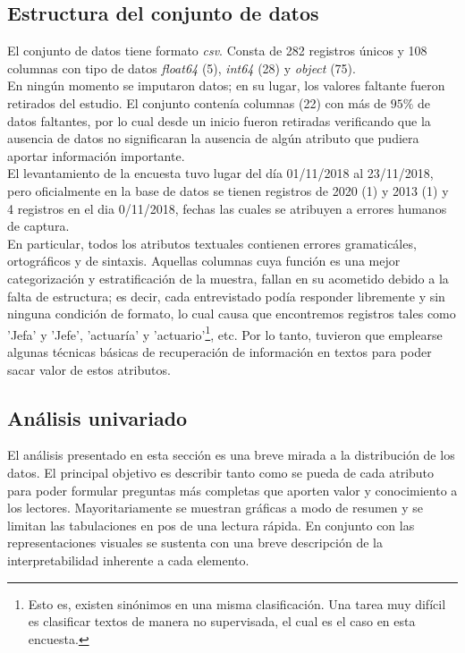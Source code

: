 \documentclass{article}
\begin{document}
\subsection{Estructura del conjunto de datos}

El conjunto de datos tiene formato \textit{csv}. Consta de 282 registros únicos y 108 columnas con tipo de datos \textit{float64} (5), \textit{int64} (28) y \textit{object} (75). \\

En ningún momento se imputaron datos; en su lugar, los valores faltante fueron retirados del estudio. El conjunto contenía columnas (22) con más de $95\%$ de datos faltantes, por lo cual desde un inicio fueron retiradas verificando que la ausencia de datos no significaran la ausencia de algún atributo que pudiera aportar información importante.  \\

El levantamiento de la encuesta tuvo lugar del día 01/11/2018 al 23/11/2018, pero oficialmente en la base de datos se tienen registros de 2020 (1) y 2013 (1) y 4 registros en el dia 0/11/2018, fechas las cuales se atribuyen a errores humanos de captura. \\

En particular, todos los atributos textuales contienen errores gramaticáles, ortográficos y de sintaxis. Aquellas columnas cuya función es una mejor categorización y estratificación de la muestra, fallan en su acometido debido a la falta de estructura; es decir, cada entrevistado podía responder libremente y sin ninguna condición de formato, lo cual causa que encontremos registros tales como 'Jefa' y 'Jefe', 'actuaría' y 'actuario'\footnote{Esto es, existen sinónimos en una misma clasificación. Una tarea muy difícil es clasificar textos de manera no supervisada, el cual es el caso en esta encuesta.}, etc. Por lo tanto, tuvieron que emplearse algunas técnicas básicas de recuperación de información en textos para poder sacar valor de estos atributos. 

\subsection{Análisis univariado}

El análisis presentado en esta sección es una breve mirada a la distribución de los datos. El principal objetivo es describir tanto como se pueda de cada atributo para poder formular preguntas más completas que aporten valor y conocimiento a los lectores. Mayoritariamente se muestran gráficas a modo de resumen y se limitan las tabulaciones en pos de una lectura rápida. En conjunto con las representaciones visuales se sustenta con una breve descripción de la interpretabilidad inherente a cada elemento. \\
\end{document}

